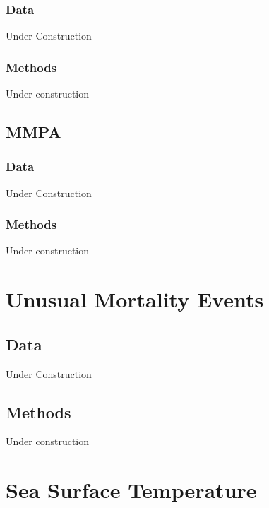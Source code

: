 \documentclass[
]{book}
\begin{document}
\hypertarget{data-6}{%
\subsection{Data}\label{data-6}}

Under Construction

\hypertarget{methods-6}{%
\subsection{Methods}\label{methods-6}}

Under construction

\hypertarget{mmpa}{%
\section{MMPA}\label{mmpa}}

\hypertarget{data-7}{%
\subsection{Data}\label{data-7}}

Under Construction

\hypertarget{methods-7}{%
\subsection{Methods}\label{methods-7}}

Under construction

\hypertarget{unusual-mortality-events}{%
\chapter{Unusual Mortality Events}\label{unusual-mortality-events}}

\hypertarget{data-8}{%
\section{Data}\label{data-8}}

Under Construction

\hypertarget{methods-8}{%
\section{Methods}\label{methods-8}}

Under construction

\hypertarget{sea-surface-temperature}{%
\chapter{Sea Surface Temperature}\label{sea-surface-temperature}}
\end{document}
